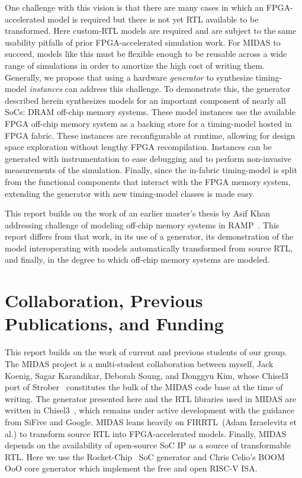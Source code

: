 One challenge with this vision is that there are many cases in which an
FPGA-accelerated model is required but there is not yet RTL available to be
transformed. Here custom-RTL models are required and are subject to the same
usability pitfalls of prior FPGA-accelerated simulation work. For MIDAS to
succeed, models like this must be flexible enough to be reusable across a wide
range of simulations in order to amortize the high cost of writing them.
Generally, we propose that using a hardware \emph{generator} to synthesize
timing-model \emph{instances} can address this challenge. To demonstrate this, the
generator described herein synthesizes models for an important component of
nearly all SoCs: DRAM off-chip memory systems. These model instances use the
available FPGA off-chip memory system as a backing store for a timing-model
hosted in FPGA fabric. These instances are reconfigurable at runtime, allowing for
design space exploration without lengthy FPGA recompilation. Instances can be
generated with instrumentation to ease debugging and to perform non-invasive
measurements of the simulation. Finally, since the in-fabric timing-model is
split from the functional components that interact with the FPGA memory system,
extending the generator with new timing-model classes is made easy.

This report builds on the work of an earlier master's thesis by Asif
Khan~\cite{khanmasters} addressing challenge of modeling off-chip memory
systems in RAMP~\cite{ramp}. This report differs from that work, in its use of
a generator, its demonstration of the model interoperating with models
automatically transformed from source RTL, and finally, in the degree to which
off-chip memory systems are modeled.

\section{Collaboration, Previous Publications, and Funding}

This report builds on the work of current and previous students of
our group. The MIDAS project is a multi-student collaboration between myself,
Jack Koenig, Sagar Karandikar, Deborah Soung, and Donggyu Kim, whose Chisel3
port of Strober~\cite{strober} constitutes the bulk of the MIDAS code
base at the time of writing. The generator presented here and the RTL libraries used
in MIDAS are written in Chisel3~\cite{chisel}, which remains under active
development with the guidance from SiFive and Google. MIDAS leans heavily on
FIRRTL~\cite{firrtl}(Adam Izraelevitz et al.) to transform source RTL into
FPGA-accelerated models. Finally, MIDAS depends on the availability of
open-source SoC IP as a source of transformable RTL. Here we use the
Rocket-Chip~\cite{rocketchip} SoC generator and Chris Celio's BOOM~\cite{boom}
OoO core generator which implement the free and open RISC-V ISA.

